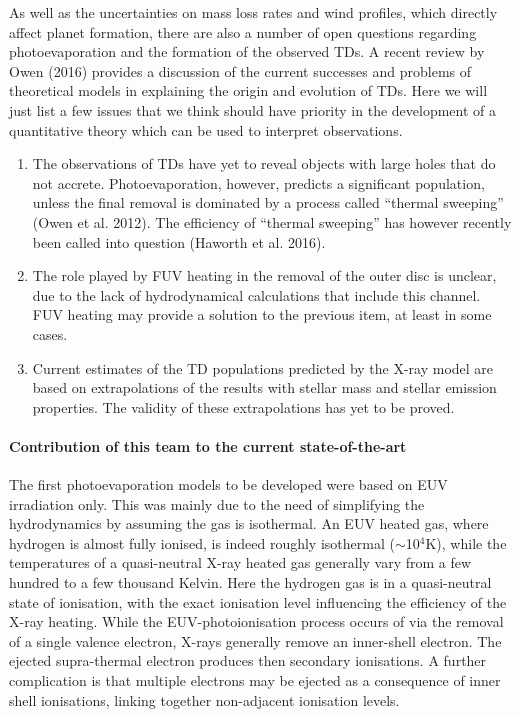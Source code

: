 \documentclass[10pt,fleqn,twoside]{article}
\begin{document}
As well as the uncertainties on mass loss rates and wind profiles,
which directly affect planet formation, there are also a number of
open questions regarding photoevaporation and the formation of the
observed TDs. A recent review by Owen (2016) provides a discussion of
the current successes and problems of theoretical models in
explaining the origin and evolution of TDs. Here we will just list a
few issues that we think should have priority in the development of a
quantitative theory which can be used to interpret observations. 

\begin{enumerate}
\item The observations of TDs have yet to reveal objects with large
  holes that do not accrete. Photoevaporation, however, predicts a
  significant population, unless the final removal is dominated by a
  process called ``thermal sweeping'' (Owen et al. 2012). The
  efficiency of  ``thermal sweeping'' has however recently been called
  into question (Haworth et al. 2016). 
\item The role played by FUV heating in the removal of the outer disc
  is unclear, due to the lack of hydrodynamical calculations that
  include this channel. FUV heating may provide a solution to the
 previous item, at least in some cases.
\item Current estimates of the TD populations predicted by the X-ray
  model are based on extrapolations of the results with stellar mass
  and stellar emission properties. The validity of these
  extrapolations has yet to be proved. 
\end{enumerate}

\paragraph{Contribution of this team to the current state-of-the-art}

The first photoevaporation models to be developed were based on EUV
irradiation only. This was mainly due to the need of simplifying the
hydrodynamics by assuming the gas is isothermal. 
An EUV heated gas, where
hydrogen is almost fully ionised, is indeed roughly isothermal
($\sim$10$^4$K), while the temperatures of a quasi-neutral X-ray
heated gas generally vary from a few hundred to a few thousand 
Kelvin. Here the hydrogen gas is in a quasi-neutral state of ionisation, with the
exact ionisation level influencing the efficiency of the X-ray
heating. While the EUV-photoionisation process occurs of via the removal
of a single valence electron, X-rays generally remove an inner-shell
electron. The ejected supra-thermal electron produces then secondary
ionisations. A further complication is that multiple electrons may be
ejected as a consequence of inner shell ionisations, linking together
non-adjacent ionisation levels.
\end{document}
